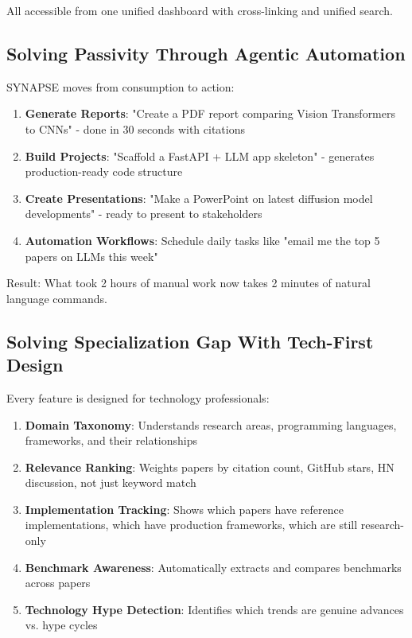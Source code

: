 \documentclass{report}
\begin{document}
All accessible from one unified dashboard with cross-linking and unified search.

\subsection{Solving Passivity Through Agentic Automation}

SYNAPSE moves from consumption to action:

\begin{enumerate}
    \item \textbf{Generate Reports}: "Create a PDF report comparing Vision Transformers to CNNs" - done in 30 seconds with citations
    \item \textbf{Build Projects}: "Scaffold a FastAPI + LLM app skeleton" - generates production-ready code structure
    \item \textbf{Create Presentations}: "Make a PowerPoint on latest diffusion model developments" - ready to present to stakeholders
    \item \textbf{Automation Workflows}: Schedule daily tasks like "email me the top 5 papers on LLMs this week"
\end{enumerate}

Result: What took 2 hours of manual work now takes 2 minutes of natural language commands.

\subsection{Solving Specialization Gap With Tech-First Design}

Every feature is designed for technology professionals:

\begin{enumerate}
    \item \textbf{Domain Taxonomy}: Understands research areas, programming languages, frameworks, and their relationships
    \item \textbf{Relevance Ranking}: Weights papers by citation count, GitHub stars, HN discussion, not just keyword match
    \item \textbf{Implementation Tracking}: Shows which papers have reference implementations, which have production frameworks, which are still research-only
    \item \textbf{Benchmark Awareness}: Automatically extracts and compares benchmarks across papers
    \item \textbf{Technology Hype Detection}: Identifies which trends are genuine advances vs. hype cycles
\end{enumerate}
\end{document}
